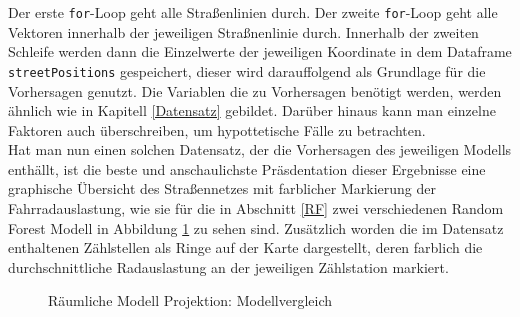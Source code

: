 \documentclass[a4paper,12pt]{thesis}
\begin{document}
Der erste \lstinline|for|-Loop geht alle Straßenlinien durch. Der zweite \lstinline|for|-Loop geht alle Vektoren innerhalb der jeweiligen Straßnenlinie durch. Innerhalb der zweiten Schleife werden dann die Einzelwerte der jeweiligen Koordinate in dem Dataframe \lstinline|streetPositions| gespeichert, dieser wird darauffolgend als Grundlage für die Vorhersagen genutzt. Die Variablen die zu Vorhersagen benötigt werden, werden ähnlich wie in Kapitell \ref{Datensatz} gebildet. Darüber hinaus kann man einzelne Faktoren auch überschreiben, um hypottetische Fälle zu betrachten.\\
Hat man nun einen solchen Datensatz, der die Vorhersagen des jeweiligen Modells enthällt, ist die beste und anschaulichste Präsdentation dieser Ergebnisse eine graphische Übersicht des Straßennetzes mit farblicher Markierung der Fahrradauslastung, wie sie für die in Abschnitt \ref{RF} zwei verschiedenen Random Forest Modell in Abbildung \ref{fig:MunsterRing} zu sehen sind. Zusätzlich worden die im Datensatz enthaltenen Zählstellen als Ringe auf der Karte dargestellt, deren farblich die durchschnittliche Radauslastung an der jeweiligen Zählstation markiert.

\begin{figure}%
	\centering

	\caption{Räumliche Modell Projektion: Modellvergleich}%
	\label{fig:MunsterRing}%
\end{figure}
\end{document}
